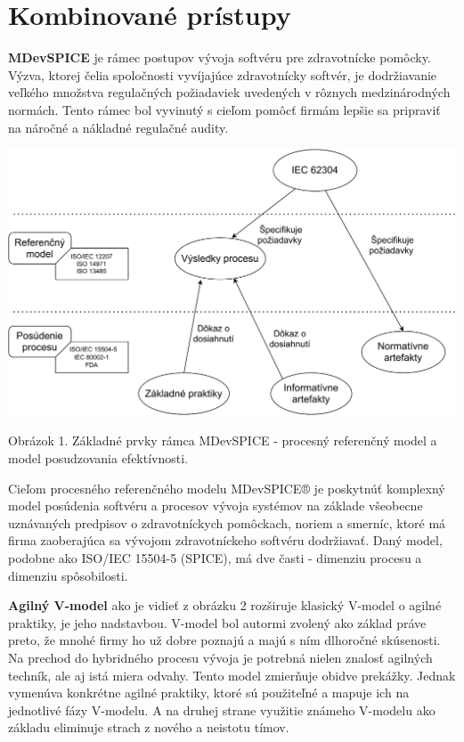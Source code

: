 \documentclass[10pt,twoside,slovak,a4paper]{article}
\begin{document}
\section{Kombinované prístupy}
\textbf{MDevSPICE} je rámec postupov vývoja softvéru pre zdravotnícke pomôcky. Výzva, ktorej čelia spoločnosti vyvíjajúce zdravotnícky softvér, je dodržiavanie veľkého množstva regulačných požiadaviek uvedených v rôznych medzinárodných normách. Tento rámec bol vyvinutý s cieľom pomôcť firmám lepšie sa pripraviť na náročné a nákladné regulačné audity\cite{mccaffery2019}.

\includegraphics[scale=0.5]{MDevSPICE.pdf}

Obrázok 1. Základné prvky rámca MDevSPICE\cite{ramecmd} - procesný referenčný model a model posudzovania efektívnosti.

Cieľom procesného referenčného modelu MDevSPICE® je poskytnúť komplexný model posúdenia softvéru a procesov vývoja systémov na základe všeobecne uznávaných predpisov o zdravotníckych pomôckach, noriem a smerníc, ktoré má firma zaoberajúca sa vývojom zdravotníckeho softvéru dodržiavať. Daný model, podobne ako ISO/IEC 15504-5 (SPICE), má dve časti - dimenziu procesu a dimenziu spôsobilosti.

\textbf{Agilný V-model} ako je vidieť z obrázku 2 rozširuje klasický V-model o agilné praktiky, je jeho nadstavbou. V-model bol autormi zvolený ako základ práve preto, že mnohé firmy ho už dobre poznajú a majú s ním dlhoročné skúsenosti. Na prechod do hybridného procesu vývoja je potrebná nielen znalosť agilných techník, ale aj istá miera odvahy. Tento model zmierňuje obidve prekážky. Jednak vymenúva konkrétne agilné praktiky, ktoré sú použiteľné a mapuje ich na jednotlivé fázy V-modelu. A na druhej strane využitie známeho V-modelu ako základu eliminuje strach z nového a neistotu tímov.
\end{document}
